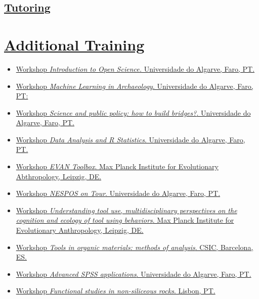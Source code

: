 \documentclass[11pt,a4paper,]{awesome-cv}
\providecommand{\tightlist}{%
	\setlength{\itemsep}{0pt}\setlength{\parskip}{0pt}}
\begin{document}
\subsection{\texorpdfstring{\ul{Tutoring}}{Tutoring}}\label{tutoring}

\begin{cvhonors}
\end{cvhonors}

\section{\texorpdfstring{\ul{Additional
Training}}{Additional Training}}\label{additional-training}

\begin{itemize}
\tightlist
\item
  \ul{Workshop \emph{Introduction to Open Science.} Universidade do
  Algarve, Faro, PT.}
\item
  \ul{Workshop \emph{Machine Learning in Archaeology}. Universidade do
  Algarve, Faro, PT:}
\item
  \ul{Workshop \emph{Science and public policy: how to build bridges?}.
  Universidade do Algarve, Faro, PT.}
\item
  \ul{Workshop \emph{Data Analysis and R Statistics}. Universidade do
  Algarve, Faro, PT.}
\item
  \ul{Workshop \emph{EVAN Toolbox}. Max Planck Institute for
  Evolutionary Abthropology, Leipzig, DE.}
\item
  \ul{Workshop \emph{NESPOS on Tour}. Universidade do Algarve, Faro,
  PT.}
\item
  \ul{Workshop \emph{Understanding tool use, multidisciplinary
  perspectives on the cognition and ecology of tool using behaviors}.
  Max Planck Institute for Evolutionary Anthropology, Leipzig, DE.}
\item
  \ul{Workshop \emph{Tools in organic materials: methods of analysis}.
  CSIC, Barcelona, ES.}
\item
  \ul{Workshop \emph{Advanced SPSS applications}. Universidade do
  Algarve, Faro, PT.}
\item
  \ul{Workshop \emph{Functional studies in non-siliceous rocks}. Lisbon,
  PT.}
\end{itemize}
\end{document}
